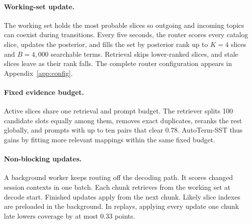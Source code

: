 \paragraph{Working-set update.}
The working set holds the most probable slices so outgoing and incoming topics
can coexist during transitions. Every five seconds, the router scores every
catalog slice, updates the posterior, and fills the set by posterior rank up
to $K=4$ slices and $B=4{,}000$ searchable terms. Retrieval skips lower-ranked
slices, and stale slices leave as their rank falls. The complete router
configuration appears in Appendix~\ref{app:config}.

\paragraph{Fixed evidence budget.}
Active slices share one retrieval and prompt budget. The retriever splits
100 candidate slots equally among them, removes exact duplicates, reranks the
rest globally, and prompts with up to ten pairs that clear 0.78. AutoTerm-SST
thus gains by fitting more relevant mappings within the same fixed budget.

\paragraph{Non-blocking updates.}
A background worker keeps routing off the decoding path. It scores changed session
contexts in one batch. Each chunk retrieves from the working set at decode start.
Finished updates apply from the next chunk. Likely slice indexes are preloaded in the
background. In replays, applying every update one chunk late lowers coverage by
at most 0.33 points.
